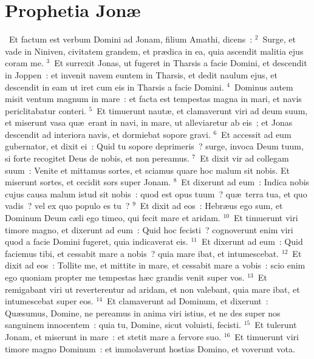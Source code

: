 {\centering \section*{Prophetia Jonæ}}\thispagestyle{empty}

~\lettrine[lines=10,image=true,loversize=0.05,lraise=-0.03]{E}{}t factum est verbum Domini ad Jonam, filium Amathi, dicens~:
${}^{2}$~Surge, et vade in Niniven, civitatem grandem, et pr\ae dica in ea, quia ascendit malitia ejus coram me.
${}^{3}$~Et surrexit Jonas, ut fugeret in Tharsis a facie Domini, et descendit in Joppen~: et invenit navem euntem in Tharsis, et dedit naulum ejus, et descendit in eam ut iret cum eis in Tharsis a facie Domini.
${}^{4}$~Dominus autem misit ventum magnum in mare~: et facta est tempestas magna in mari, et navis periclitabatur conteri.
${}^{5}$~Et timuerunt naut\ae , et clamaverunt viri ad deum suum, et miserunt vasa qu\ae\ erant in navi, in mare, ut alleviaretur ab eis~; et Jonas descendit ad interiora navis, et dormiebat sopore gravi.
${}^{6}$~Et accessit ad eum gubernator, et dixit ei~: Quid tu sopore deprimeris~? surge, invoca Deum tuum, si forte recogitet Deus de nobis, et non pereamus.
${}^{7}$~Et dixit vir ad collegam suum~: Venite et mittamus sortes, et sciamus quare hoc malum sit nobis. Et miserunt sortes, et cecidit sors super Jonam.
${}^{8}$~Et dixerunt ad eum~: Indica nobis cujus causa malum istud sit nobis~: quod est opus tuum~? qu\ae\ terra tua, et quo vadis~? vel ex quo populo es tu~?
${}^{9}$~Et dixit ad eos~: Hebr\ae us ego sum, et Dominum Deum c\ae li ego timeo, qui fecit mare et aridam.
${}^{10}$~Et timuerunt viri timore magno, et dixerunt ad eum~: Quid hoc fecisti~? cognoverunt enim viri quod a facie Domini fugeret, quia indicaverat eis.
${}^{11}$~Et dixerunt ad eum~: Quid faciemus tibi, et cessabit mare a nobis~? quia mare ibat, et intumescebat.
${}^{12}$~Et dixit ad eos~: Tollite me, et mittite in mare, et cessabit mare a vobis~: scio enim ego quoniam propter me tempestas h\ae c grandis venit super vos.
${}^{13}$~Et remigabant viri ut reverterentur ad aridam, et non valebant, quia mare ibat, et intumescebat super eos.
${}^{14}$~Et clamaverunt ad Dominum, et dixerunt~: Qu\ae sumus, Domine, ne pereamus in anima viri istius, et ne des super nos sanguinem innocentem~: quia tu, Domine, sicut voluisti, fecisti.
${}^{15}$~Et tulerunt Jonam, et miserunt in mare~: et stetit mare a fervore suo.
${}^{16}$~Et timuerunt viri timore magno Dominum~: et immolaverunt hostias Domino, et voverunt vota.
